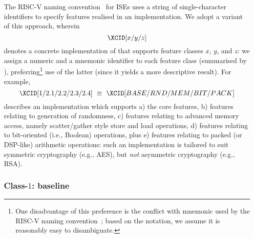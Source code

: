 The RISC-V naming convention~\cite[Section 22]{SCARV:RV:ISA:I:17} for ISEs
uses a string of single-character identifiers to specify features realised
in an implementation.  We adopt a variant of this approach, wherein
\[
\XCID[x/y/z]
\]
denotes a concrete implementation of \XCID that supports feature classes 
$x$, $y$, and $z$: we assign a numeric and a mnemonic identifier to each
feature class (summarised by ), preferring\footnote{
One disadvantage of this preference is the conflict with mnemonic used by
the RISC-V naming convention~\cite[Section 22]{SCARV:RV:ISA:I:17}; based
on the notation, we assume it is reasonably easy to disambiguate.
} use of the latter (since it yields a more descriptive result).  
For example,
\[
\XCID[1/2.1/2.2/2.3/2.4] ~\equiv~ \XCID[BASE/RND/MEM/BIT/PACK]
\]
describes an implementation which supports
a) the core features,
b) features relating to generation of randomness,
c) features relating to advanced memory access, namely scatter/gather
   style store and load operations,
d) features relating to bit-oriented (i.e., Boolean) operations,
   plus
e) features relating to packed (or DSP-like) arithmetic operations:
such an implementation is tailored to suit symmetric cryptography (e.g.,
AES), but {\em not} asymmetric cryptography (e.g., RSA).



\subsubsection{Class-$1$:   baseline}
\label{sec:bg:feature:1}



